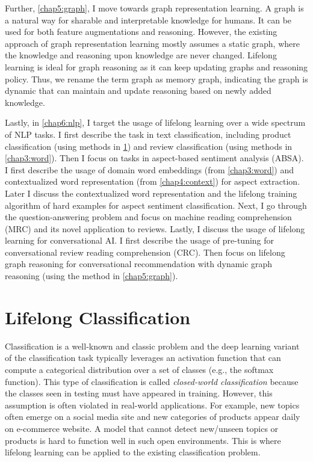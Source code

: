 Further, \ref{chap5:graph}, I move towards graph representation learning.
A graph is a natural way for sharable and interpretable knowledge for humans.
It can be used for both feature augmentations and reasoning.
However, the existing approach of graph representation learning mostly assumes a static graph, where the knowledge and reasoning upon knowledge are never changed.
Lifelong learning is ideal for graph reasoning as it can keep updating graphs and reasoning policy.
Thus, we rename the term graph as memory graph, indicating the graph is dynamic that can maintain and update reasoning based on newly added knowledge.

Lastly, in \ref{chap6:nlp}, I target the usage of lifelong learning over a wide spectrum of NLP tasks.
I first describe the task in text classification, including product classification (using methods in \ref{chap2:open}) and review classification (using methods in \ref{chap3:word}).
Then I focus on tasks in aspect-based sentiment analysis (ABSA).
I first describe the usage of domain word embeddings (from \ref{chap3:word}) and contextualized word representation (from \ref{chap4:context}) for aspect extraction.
Later I discuss the contextualized word representation and the lifelong training algorithm of hard examples for aspect sentiment classification.
Next, I go through the question-answering problem and focus on machine reading comprehension (MRC) and its novel application to reviews.
Lastly, I discuss the usage of lifelong learning for conversational AI. 
I first describe the usage of pre-tuning for conversational review reading comprehension (CRC).
Then focus on lifelong graph reasoning for conversational recommendation with dynamic graph reasoning (using the method in \ref{chap5:graph}).

\chapter{Lifelong Classification}
\label{chap2:open}

Classification is a well-known and classic problem and the deep learning variant of the classification task typically leverages an activation function that can compute a categorical distribution over a set of classes (e.g., the softmax function).
This type of classification is called \textit{closed-world classification} because the classes seen in testing must have appeared in training. However, this assumption is often violated in real-world applications. For example, new topics often emerge on a social media site and new categories of products appear daily on e-commerce website. 
A model that cannot detect new/unseen topics or products is hard to function well in such open environments.  
This is where lifelong learning can be applied to the existing classification problem.

